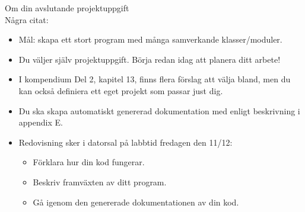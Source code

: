 


\ifkompendium\else


\begin{SlideExtra}{Om din avslutande projektuppgift}\SlideFontSmall
{} \\
Några citat:
\begin{itemize}
\item Mål: skapa ett stort program med många samverkande klasser/moduler.
\item Du väljer själv projektuppgift. Börja redan idag att planera ditt arbete!

\item I kompendium Del 2, kapitel 13, finns flera förslag att välja bland, men du kan också definiera ett eget projekt som passar just dig.


\item Du ska skapa automatiskt genererad dokumentation med  enligt beskrivning i appendix E.

\item Redovisning sker i datorsal på labbtid fredagen den 11/12:
\begin{itemize}\SlideFontTiny
  \item Förklara hur din kod fungerar.
  \item Beskriv framväxten av ditt program.
  \item Gå igenom den genererade dokumentationen av din kod.
\end{itemize}
\end{itemize}

\end{SlideExtra}

